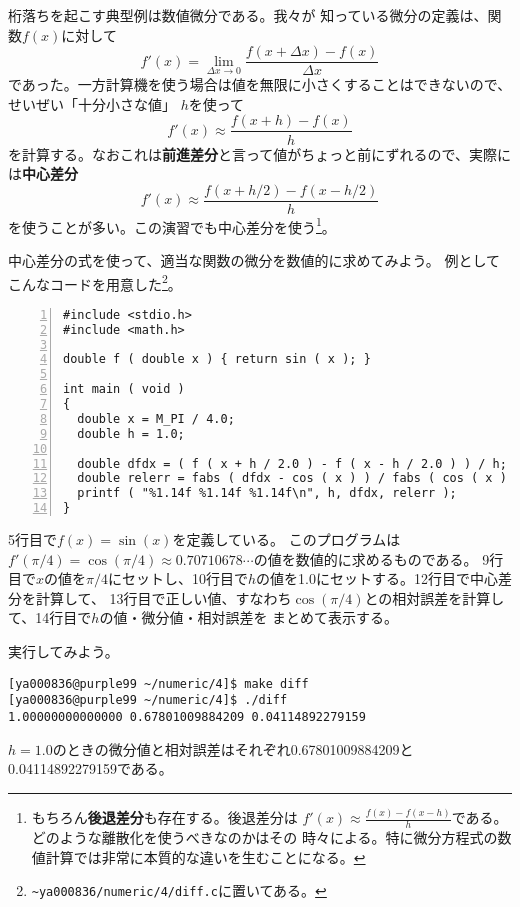 \documentclass[a4paper]{jsarticle}
\begin{document}
桁落ちを起こす典型例は数値微分である。我々が
知っている微分の定義は、関数$f(x)$に対して
\begin{equation*}
f'(x) = \lim_{\Delta x \rightarrow 0} \frac{f(x+\Delta x) - f(x)}{\Delta x}
\end{equation*}
であった。一方計算機を使う場合は値を無限に小さくすることはできないので、せいぜい「十分小さな値」
$h$を使って
\begin{equation*}
f'(x) \approx \frac{f(x+h) - f(x)}{h}
\end{equation*}
を計算する。なおこれは\textbf{前進差分}と言って値がちょっと前にずれるので、実際には\textbf{中心差分}
\begin{equation*}
f'(x) \approx \frac{f(x+h/2) - f(x-h/2)}{h}
\end{equation*}
を使うことが多い。この演習でも中心差分を使う\footnote{もちろん\textbf{後退差分}も存在する。後退差分は
$\displaystyle f'(x) \approx \frac{f(x) - f(x-h)}{h}$である。どのような離散化を使うべきなのかはその
時々による。特に微分方程式の数値計算では非常に本質的な違いを生むことになる。}。

中心差分の式を使って、適当な関数の微分を数値的に求めてみよう。
例としてこんなコードを用意した\footnote{\texttt{\~{}ya000836/numeric/4/diff.c}に置いてある。
}。
\begin{lstlisting}[caption={\texttt{diff.c}},numbers=left]
#include <stdio.h>
#include <math.h>

double f ( double x ) { return sin ( x ); }

int main ( void )
{
  double x = M_PI / 4.0;
  double h = 1.0;

  double dfdx = ( f ( x + h / 2.0 ) - f ( x - h / 2.0 ) ) / h;
  double relerr = fabs ( dfdx - cos ( x ) ) / fabs ( cos ( x ) );
  printf ( "%1.14f %1.14f %1.14f\n", h, dfdx, relerr );
}
\end{lstlisting}
5行目で$f(x) = \sin (x)$を定義している。
このプログラムは$f'(\pi/4) = \cos(\pi/4) \approx 0.70710678\cdots$の値を数値的に求めるものである。
9行目で$x$の値を$\pi/4$にセットし、10行目で$h$の値を1.0にセットする。12行目で中心差分を計算して、
13行目で正しい値、すなわち$\cos(\pi/4)$との相対誤差を計算して、14行目で$h$の値・微分値・相対誤差を
まとめて表示する。

実行してみよう。
\begin{lstlisting}
[ya000836@purple99 ~/numeric/4]$ make diff
[ya000836@purple99 ~/numeric/4]$ ./diff
1.00000000000000 0.67801009884209 0.04114892279159
\end{lstlisting}
$h=1.0$のときの微分値と相対誤差はそれぞれ0.67801009884209と0.04114892279159である。
\end{document}
